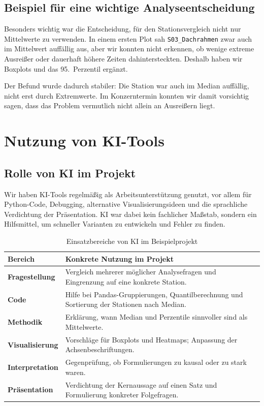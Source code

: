 \documentclass[a4paper, 11pt]{article}
\begin{document}
\subsection{Beispiel für eine wichtige Analyseentscheidung}

Besonders wichtig war die Entscheidung, für den Stationsvergleich nicht nur Mittelwerte zu verwenden. In einem ersten Plot sah \texttt{S03\_Dachrahmen} zwar auch im Mittelwert auffällig aus, aber wir konnten nicht erkennen, ob wenige extreme Ausreißer oder dauerhaft höhere Zeiten dahintersteckten. Deshalb haben wir Boxplots und das 95.\ Perzentil ergänzt.

Der Befund wurde dadurch stabiler: Die Station war auch im Median auffällig, nicht erst durch Extremwerte. Im Konzerntermin konnten wir damit vorsichtig sagen, dass das Problem vermutlich nicht allein an Ausreißern liegt.

\section{Nutzung von KI-Tools}

\subsection{Rolle von KI im Projekt}

Wir haben KI-Tools regelmäßig als Arbeitsunterstützung genutzt, vor allem für Python-Code, Debugging, alternative Visualisierungsideen und die sprachliche Verdichtung der Präsentation. KI war dabei kein fachlicher Maßstab, sondern ein Hilfsmittel, um schneller Varianten zu entwickeln und Fehler zu finden.

\begin{table}[htbp]
\centering
\caption{Einsatzbereiche von KI im Beispielprojekt}
\begin{tabular}{p{3.4cm}p{11.0cm}}
\hline
\textbf{Bereich} & \textbf{Konkrete Nutzung im Projekt} \\
\hline
\textbf{Fragestellung} & Vergleich mehrerer möglicher Analysefragen und Eingrenzung auf eine konkrete Station. \\
\textbf{Code} & Hilfe bei Pandas-Gruppierungen, Quantilberechnung und Sortierung der Stationen nach Median. \\
\textbf{Methodik} & Erklärung, wann Median und Perzentile sinnvoller sind als Mittelwerte. \\
\textbf{Visualisierung} & Vorschläge für Boxplots und Heatmaps; Anpassung der Achsenbeschriftungen. \\
\textbf{Interpretation} & Gegenprüfung, ob Formulierungen zu kausal oder zu stark waren. \\
\textbf{Präsentation} & Verdichtung der Kernaussage auf einen Satz und Formulierung konkreter Folgefragen. \\
\hline
\end{tabular}
\end{table}
\end{document}

